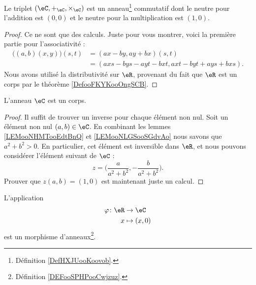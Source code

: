 \begin{lemma}
	Le triplet \( (\eC,+_{\eC}, \times_{\eC})\) est un anneau\footnote{Définition \ref{DefHXJUooKoovob}.} commutatif dont le neutre pour l'addition est \( (0,0)\) et le neutre pour la multiplication est \( (1,0)\).
\end{lemma}

\begin{proof}
	Ce ne sont que des calculs. Juste pour vous montrer, voici la première partie pour l'associativité :
	\begin{subequations}
		\begin{align}
			\big( (a,b)(x,y) \big)(s,t) & =(ax-by,ay+bx)(s,t)                 \\
			                            & =(axs-bys-ayt-bxt,axt-byt+ays+bxs).
		\end{align}
	\end{subequations}
	Nous avons utilisé la distributivité sur \( \eR\), provenant du fait que \( \eR\) est un corps par le théorème \ref{DefooFKYKooOngSCB}.
\end{proof}

\begin{lemma}		\label{LEMooXTDDooFAjWRm}
	L'anneau \( \eC\) est un corps.
\end{lemma}

\begin{proof}
	Il suffit de trouver un inverse pour chaque élément non nul. Soit un élément non nul \( (a,b)\in \eC\). En combinant les lemmes \ref{LEMooNHMTooEdtBnQ} et \ref{LEMooNLGSooSGdvAo} nous savons que \( a^2+b^2>0\). En particulier, cet élément est inversible dans \( \eR\), et nous pouvons considérer l'élément suivant de \( \eC\) :
	\begin{equation}
		z=\big( \frac{ a }{ a^2+b^2 }, -\frac{ b }{ a^2+b^2 } \big).
	\end{equation}
	Prouver que \( z(a,b)=(1,0)\) est maintenant juste un calcul.
\end{proof}

\begin{lemma}
	L'application
	\begin{equation}
		\begin{aligned}
			\varphi\colon \eR & \to \eC       \\
			x                 & \mapsto (x,0)
		\end{aligned}
	\end{equation}
	est un morphisme d'anneaux\footnote{Définition \ref{DEFooSPHPooCwjzuz}.}.
\end{lemma}

